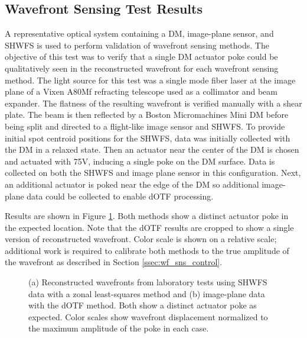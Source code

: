 \documentclass[]{spie}  %
\begin{document}
\subsection{Wavefront Sensing Test Results}\label{sec:wfs_test_results}
A representative optical system containing a \gls{DM}, image-plane sensor, and \gls{SHWFS} is used to perform validation of wavefront sensing methods. The objective of this test was to verify that a single DM actuator poke could be qualitatively seen in the reconstructed wavefront for each wavefront sensing method.
The light source for this test was a single mode fiber laser at  the image plane of a Vixen A80Mf refracting telescope used as a collimator and beam expander.
 The flatness of the resulting wavefront is verified manually with a shear plate. The beam is then reflected by a Boston Micromachines Mini DM before being split and directed to a flight-like image sensor and \gls{SHWFS}. 
To provide initial spot centroid positions for the SHWFS, data was initially collected with the DM in a relaxed state. Then an actuator near the center of the DM is chosen and actuated with 75V, inducing a single poke on the DM surface. Data is collected on both the SHWFS and image plane sensor in this configuration. Next, an additional actuator is poked near the edge of the DM so additional image-plane data could be collected to enable dOTF processing.

Results are shown in Figure \ref{fig:WFSTestResults}. Both methods show a distinct actuator poke in the expected location. Note that the dOTF results are cropped to show a single version of reconstructed wavefront. Color scale is shown on a relative scale; additional work is required to calibrate both methods to the true amplitude of the wavefront as described in Section \ref{ssec:wf_sns_control}.

\begin{figure}[h]
\centering
{}
\caption{\label{fig:WFSTestResults} (a) Reconstructed wavefronts from laboratory tests using \gls{SHWFS} data with a zonal least-squares method and (b) image-plane data with the dOTF method. Both show a distinct actuator poke as expected. Color scales show wavefront displacement normalized to the maximum amplitude of the poke in each case. }
\end{figure}
\end{document}
